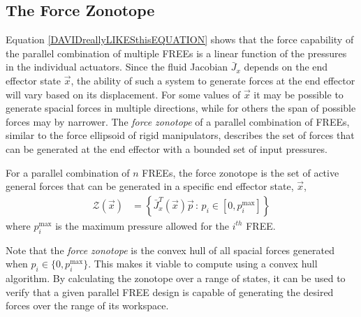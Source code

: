 \subsection{The Force Zonotope}
Equation \eqref{DAVIDreallyLIKESthisEQUATION} shows that the force capability of the parallel combination of multiple FREEs is a linear function of the pressures in the individual actuators.
Since the fluid Jacobian $\bar{J}_{x}$ depends on the end effector state $\vec{x}$, the ability of such a system to generate forces at the end effector will vary based on its displacement.
For some values of $\vec{x}$ it may be possible to generate spacial forces in multiple directions, while for others the span of possible forces may by narrower. 
The \emph{force zonotope} of a parallel combination of FREEs, similar to the force ellipsoid of rigid manipulators, 
describes the set of forces that can be generated at the end effector with a bounded set of input pressures.

\begin{definition}
    For a parallel combination of $n$ FREEs, the force zonotope is the set of active general 
    forces that can be generated in a specific end effector state, $\vec{x}$,
    \begin{align}
        \mathcal{Z}(\vec{x}) &= \left\{\bar{J}^T_x (\vec{x}) \vec{p} \, : \, p_i \in [0,p_i^\text{max}] \right\}     \label{eq:zonotope}
    \end{align}
    where $p_i^{\text{max}}$ is the maximum pressure allowed for the $i^{th}$ FREE.
\end{definition}

Note that the \emph{force zonotope} is the convex hull of all spacial forces generated when $p_i \in \{0, p_i^{\text{max}}\}$.
This makes it viable to compute using a convex hull algorithm. By calculating the zonotope over a range of states, it can be used to verify that a given parallel FREE design is capable of generating the desired forces over the range of its workspace. 


